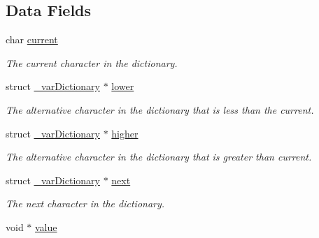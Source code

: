 \subsection*{Data Fields}
\begin{DoxyCompactItemize}
\item 
\hypertarget{struct__var_dictionary_a6044b553e445970269cef9b91569d09d}{
char \hyperlink{struct__var_dictionary_a6044b553e445970269cef9b91569d09d}{current}}
\label{struct__var_dictionary_a6044b553e445970269cef9b91569d09d}

\begin{DoxyCompactList}\small\item\em The current character in the dictionary. \item\end{DoxyCompactList}\item 
\hypertarget{struct__var_dictionary_af4f42c4bd665dc7ce0eeb75463767339}{
struct \hyperlink{struct__var_dictionary}{\_\-varDictionary} $\ast$ \hyperlink{struct__var_dictionary_af4f42c4bd665dc7ce0eeb75463767339}{lower}}
\label{struct__var_dictionary_af4f42c4bd665dc7ce0eeb75463767339}

\begin{DoxyCompactList}\small\item\em The alternative character in the dictionary that is less than the current. \item\end{DoxyCompactList}\item 
\hypertarget{struct__var_dictionary_ae67896ead2bf6d8fe6307445102b2e0f}{
struct \hyperlink{struct__var_dictionary}{\_\-varDictionary} $\ast$ \hyperlink{struct__var_dictionary_ae67896ead2bf6d8fe6307445102b2e0f}{higher}}
\label{struct__var_dictionary_ae67896ead2bf6d8fe6307445102b2e0f}

\begin{DoxyCompactList}\small\item\em The alternative character in the dictionary that is greater than current. \item\end{DoxyCompactList}\item 
\hypertarget{struct__var_dictionary_a3fab7f59fc3c8c7babba590499c69f63}{
struct \hyperlink{struct__var_dictionary}{\_\-varDictionary} $\ast$ \hyperlink{struct__var_dictionary_a3fab7f59fc3c8c7babba590499c69f63}{next}}
\label{struct__var_dictionary_a3fab7f59fc3c8c7babba590499c69f63}

\begin{DoxyCompactList}\small\item\em The next character in the dictionary. \item\end{DoxyCompactList}\item 
\hypertarget{struct__var_dictionary_a0f61d63b009d0880a89c843bd50d8d76}{
void $\ast$ \hyperlink{struct__var_dictionary_a0f61d63b009d0880a89c843bd50d8d76}{value}}
\label{struct__var_dictionary_a0f61d63b009d0880a89c843bd50d8d76}


\end{DoxyCompactItemize}
